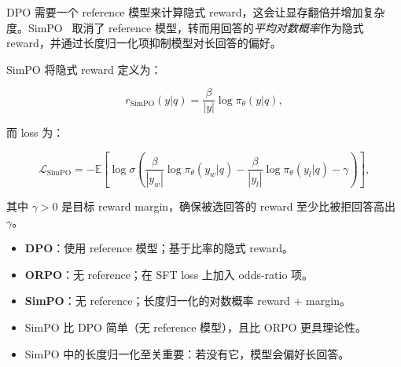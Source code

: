 \begin{intuitionbox}[无参考模型的偏好学习]
DPO 需要一个 reference 模型来计算隐式 reward，这会让显存翻倍并增加复杂度。SimPO~\cite{meng2024simpo} 取消了 reference 模型，转而用回答的\emph{平均对数概率}作为隐式 reward，并通过长度归一化项抑制模型对长回答的偏好。
\end{intuitionbox}

SimPO 将隐式 reward 定义为：

\[
r_{\text{SimPO}}(y|q) = \frac{\beta}{|y|} \log \pi_\theta(y|q),
\]

而 loss 为：

\[
\boxed{
    \mathcal{L}_{\text{SimPO}} = -\mathbb{E}\!\left[
      \log \sigma\!\left(
        \frac{\beta}{|y_w|}\log\pi_\theta(y_w|q)
        - \frac{\beta}{|y_l|}\log\pi_\theta(y_l|q)
        - \gamma
      \right)
    \right],
  }
\]

其中 $\gamma > 0$ 是目标 reward margin，确保被选回答的 reward 至少比被拒回答高出 $\gamma$。

\begin{keybox}
\begin{itemize}
  \item \textbf{DPO}：使用 reference 模型；基于比率的隐式 reward。
  \item \textbf{ORPO}：无 reference；在 SFT loss 上加入 odds-ratio 项。
  \item \textbf{SimPO}：无 reference；长度归一化的对数概率 reward + margin。
  \item SimPO 比 DPO 简单（无 reference 模型），且比 ORPO 更具理论性。
  \item SimPO 中的长度归一化至关重要：若没有它，模型会偏好长回答。
\end{itemize}
\end{keybox}


